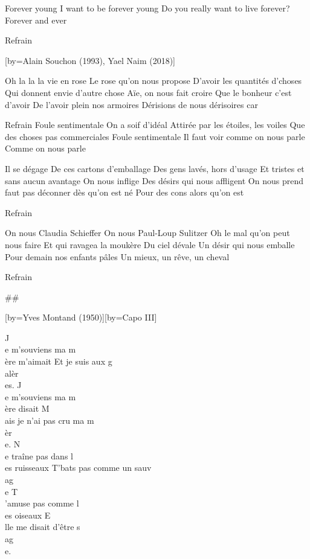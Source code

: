 \beginverse
Forever young
I want to be forever young
Do you really want to live forever?
Forever and ever
\endverse

\beginverse
Refrain
\endverse

[by={Alain Souchon (1993), Yael Naim (2018)}]

\beginverse
Oh la la la vie en rose
Le rose qu'on nous propose
D'avoir les quantités d'choses
Qui donnent envie d'autre chose
Aïe, on nous fait croire
Que le bonheur c'est d'avoir
De l'avoir plein nos armoires
Dérisions de nous dérisoires car
\endverse

\beginverse
Refrain
Foule sentimentale
On a soif d'idéal
Attirée par les étoiles, les voiles
Que des choses pas commerciales
Foule sentimentale
Il faut voir comme on nous parle
Comme on nous parle
\endverse

\beginverse
Il se dégage
De ces cartons d'emballage
Des gens lavés, hors d'usage
Et tristes et sans aucun avantage
On nous inflige
Des désirs qui nous affligent
On nous prend faut pas déconner dès qu'on est né
Pour des cons alors qu'on est
\endverse

\beginverse
Refrain
\endverse

\beginverse
On nous Claudia Schieffer
On nous Paul-Loup Sulitzer
Oh le mal qu'on peut nous faire
Et qui ravagea la moukère
Du ciel dévale
Un désir qui nous emballe
Pour demain nos enfants pâles
Un mieux, un rêve, un cheval
\endverse

\beginverse
Refrain
\endverse

## 

[by={Yves Montand (1950)}][by={Capo III}]

\beginverse
J\\[Do]e m'souviens ma m\\[Sol7]ère m'aimait
Et je suis aux g\\[Do]alèr\\[Mi7]es.
J\\[Lam]e m'souviens ma m\\[Mi]ère disait
M\\[Mi7]ais je n'ai pas cru ma m\\[Lam]èr\\[Sol7]e.
N\\[Do]e traîne pas dans l\\[Sol7]es ruisseaux
T'bats pas comme un sauv\\[Do]ag\\[Mi7]e
T\\[Lam]'amuse pas comme l\\[Mi]es oiseaux
E\\[mi7]lle me disait d'être s\\[Lam]ag\\[Sol7]e.
\endverse

